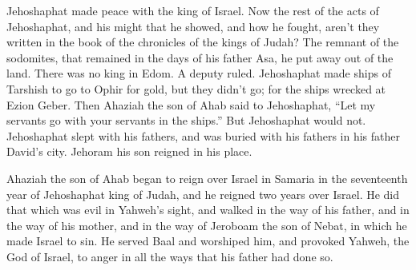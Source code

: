 {Jehoshaphat made peace with the king of Israel.
Now the rest of the acts of Jehoshaphat, and his might that he showed, and how he fought, aren’t they written in the book of the chronicles of the kings of Judah?
The remnant of the sodomites, that remained in the days of his father Asa, he put away out of the land.
There was no king in Edom. A deputy ruled.
Jehoshaphat made ships of Tarshish to go to Ophir for gold, but they didn’t go; for the ships wrecked at Ezion Geber.
Then Ahaziah the son of Ahab said to Jehoshaphat, “Let my servants go with your servants in the ships.” But Jehoshaphat would not.
Jehoshaphat slept with his fathers, and was buried with his fathers in his father David’s city. Jehoram his son reigned in his place.
\par }{\PP {}Ahaziah the son of Ahab began to reign over Israel in Samaria in the seventeenth year of Jehoshaphat king of Judah, and he reigned two years over Israel.
He did that which was evil in Yahweh’s sight, and walked in the way of his father, and in the way of his mother, and in the way of Jeroboam the son of Nebat, in which he made Israel to sin.
He served Baal and worshiped him, and provoked Yahweh, the God of Israel, to anger in all the ways that his father had done so.
\par }